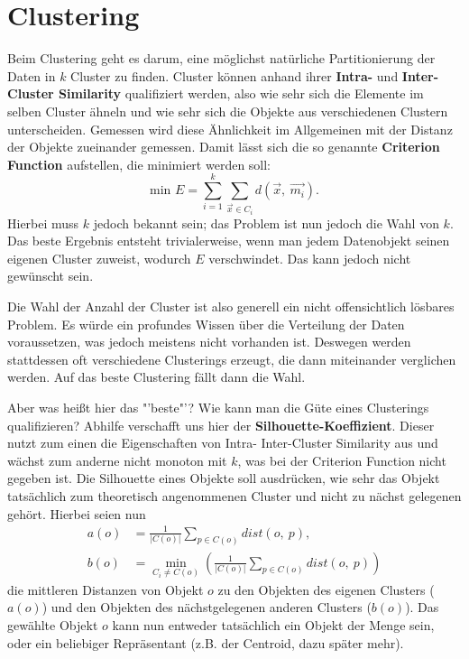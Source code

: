 \section{Clustering}
Beim Clustering geht es darum, eine möglichst natürliche 
Partitionierung der Daten in \(k\) Cluster zu finden. Cluster
können anhand ihrer \textbf{Intra-} und \textbf{Inter-Cluster
Similarity} qualifiziert werden, also wie sehr sich die Elemente
im selben Cluster ähneln und wie sehr sich die Objekte aus
verschiedenen Clustern unterscheiden. Gemessen wird diese
Ähnlichkeit im Allgemeinen mit der Distanz der Objekte zueinander
gemessen. Damit lässt sich die so genannte \textbf{Criterion
Function} aufstellen, die minimiert werden soll:
\[\text{min } E = \sum_{i=1}^k \sum_{\vec{x}\in C_i} 
d(\vec{x},\ \vec{m_i}).\]
Hierbei muss \(k\) jedoch bekannt sein; das Problem ist nun
jedoch die Wahl von \(k\). Das beste Ergebnis entsteht
trivialerweise, wenn man jedem Datenobjekt seinen eigenen
Cluster zuweist, wodurch \(E\) verschwindet. Das kann
jedoch nicht gewünscht sein. 

Die Wahl der Anzahl der Cluster ist also generell ein nicht 
offensichtlich lösbares Problem. Es würde ein profundes Wissen
über die Verteilung der Daten voraussetzen, was jedoch meistens
nicht vorhanden ist. Deswegen werden stattdessen oft verschiedene
Clusterings erzeugt, die dann miteinander verglichen werden. Auf
das beste Clustering fällt dann die Wahl.

Aber was heißt hier das "'beste"'? Wie kann man die Güte eines
Clusterings qualifizieren? Abhilfe verschafft uns hier der 
\textbf{Silhouette-Koeffizient}. Dieser nutzt zum einen die
Eigenschaften von Intra- \/ Inter-Cluster Similarity aus und 
wächst zum anderne nicht monoton mit \(k\), was bei der
Criterion Function nicht gegeben ist. Die Silhouette eines Objekte
soll ausdrücken, wie sehr das Objekt tatsächlich zum
theoretisch angenommenen Cluster und nicht zu nächst gelegenen
gehört. Hierbei seien nun
\begin{align*}
a(o)&=\frac{1}{\left| C(o) \right|}\sum_{p\in C(o)}dist(o,\ p),\\
b(o)&=\min_{C_i \neq C(o)} \left(\frac{1}{\left| C(o) \right|}
\sum_{p\in C(o)}dist(o,\ p)\right)
\end{align*}
die mittleren Distanzen von Objekt \(o\) zu den Objekten des
eigenen Clusters (\(a(o)\)) und den Objekten des nächstgelegenen
anderen Clusters (\(b(o)\)). Das gewählte Objekt \(o\) kann
nun entweder tatsächlich ein Objekt der Menge sein, oder ein
beliebiger Repräsentant (z.B. der Centroid, dazu später mehr).

